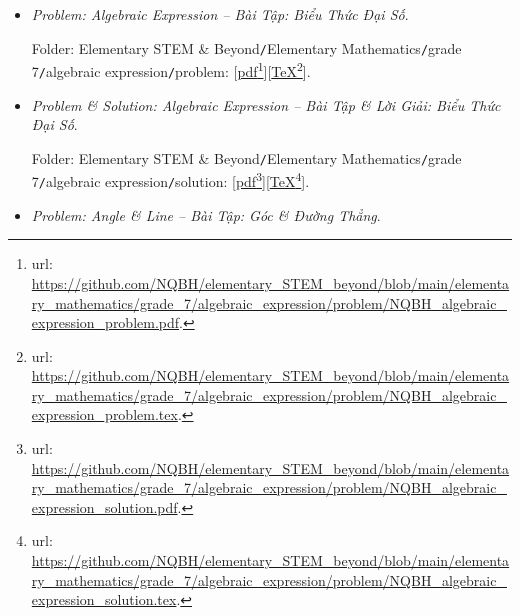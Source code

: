 \documentclass[12pt]{article}
\begin{document}
\begin{itemize}
	Folder: {\sf Elementary STEM \& Beyond{\tt/}Elementary Mathematics{\tt/}grade 7{\tt/}real{\tt/}solution}: [\href{https://github.com/NQBH/elementary_STEM_beyond/blob/main/elementary_mathematics/grade_7/real/problem/NQBH_real_solution.pdf}{pdf}\footnote{{\sc url}: \url{https://github.com/NQBH/elementary_STEM_beyond/blob/main/elementary_mathematics/grade_7/real/problem/NQBH_real_solution.pdf}.}][\href{https://github.com/NQBH/elementary_STEM_beyond/blob/main/elementary_mathematics/grade_7/real/problem/NQBH_real_solution.tex}{\TeX}\footnote{{\sc url}: \url{https://github.com/NQBH/elementary_STEM_beyond/blob/main/elementary_mathematics/grade_7/real/problem/NQBH_real_solution.tex}.}].
	\item {\it Problem: Algebraic Expression -- Bài Tập: Biểu Thức Đại Số}.
	
	Folder: {\sf Elementary STEM \& Beyond{\tt/}Elementary Mathematics{\tt/}grade 7{\tt/}algebraic expression{\tt/}problem}: [\href{https://github.com/NQBH/elementary_STEM_beyond/blob/main/elementary_mathematics/grade_7/algebraic_expression/problem/NQBH_algebraic_expression_problem.pdf}{pdf}\footnote{{\sc url}: \url{https://github.com/NQBH/elementary_STEM_beyond/blob/main/elementary_mathematics/grade_7/algebraic_expression/problem/NQBH_algebraic_expression_problem.pdf}.}][\href{https://github.com/NQBH/elementary_STEM_beyond/blob/main/elementary_mathematics/grade_7/algebraic_expression/problem/NQBH_algebraic_expression_problem.tex}{\TeX}\footnote{{\sc url}: \url{https://github.com/NQBH/elementary_STEM_beyond/blob/main/elementary_mathematics/grade_7/algebraic_expression/problem/NQBH_algebraic_expression_problem.tex}.}].
	\item {\it Problem \& Solution: Algebraic Expression -- Bài Tập \& Lời Giải: Biểu Thức Đại Số}.
	
	Folder: {\sf Elementary STEM \& Beyond{\tt/}Elementary Mathematics{\tt/}grade 7{\tt/}algebraic expression{\tt/}solution}: [\href{https://github.com/NQBH/elementary_STEM_beyond/blob/main/elementary_mathematics/grade_7/algebraic_expression/problem/NQBH_algebraic_expression_solution.pdf}{pdf}\footnote{{\sc url}: \url{https://github.com/NQBH/elementary_STEM_beyond/blob/main/elementary_mathematics/grade_7/algebraic_expression/problem/NQBH_algebraic_expression_solution.pdf}.}][\href{https://github.com/NQBH/elementary_STEM_beyond/blob/main/elementary_mathematics/grade_7/algebraic_expression/problem/NQBH_algebraic_expression_solution.tex}{\TeX}\footnote{{\sc url}: \url{https://github.com/NQBH/elementary_STEM_beyond/blob/main/elementary_mathematics/grade_7/algebraic_expression/problem/NQBH_algebraic_expression_solution.tex}.}].	
	\item {\it Problem: Angle \& Line -- Bài Tập: Góc \& Đường Thẳng}.
	

\end{itemize}
\end{document}
